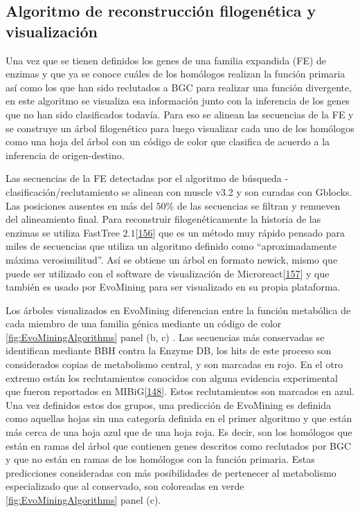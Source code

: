\documentclass[12pt,twoside]{reedthesis}
\begin{document}
  \subsection{Algoritmo de reconstrucción filogenética y
  visualización}\label{algoritmo-de-reconstruccion-filogenetica-y-visualizacion-1}
  
  Una vez que se tienen definidos los genes de una familia expandida (FE)
  de enzimas y que ya se conoce cuáles de los homólogos realizan la
  función primaria así como los que han sido reclutados a BGC para
  realizar una función divergente, en este algoritmo se visualiza esa
  información junto con la inferencia de los genes que no han sido
  clasificados todavía. Para eso se alinean las secuencias de la FE y se
  construye un árbol filogenético para luego visualizar cada uno de los
  homólogos como una hoja del árbol con un código de color que clasifica
  de acuerdo a la inferencia de origen-destino.
  
  Las secuencias de la FE detectadas por el algoritmo de búsqueda -
  clasificación/reclutamiento se alinean con muscle v3.2 y son curadas con
  Gblocks. Las posiciones ausentes en más del \(50\%\) de las secuencias
  se filtran y remueven del alineamiento final. Para reconstruir
  filogenéticamente la historia de las enzimas se utiliza FastTree
  \(2.1\){[}\protect\hyperlink{ref-price_fasttree_2010}{156}{]} que es un
  método muy rápido pensado para miles de secuencias que utiliza un
  algoritmo definido como ``aproximadamente máxima verosimilitud''. Así se
  obtiene un árbol en formato newick, mismo que puede ser utilizado con el
  software de visualización de
  Microreact{[}\protect\hyperlink{ref-argimon_microreact_2016}{157}{]} y
  que también es usado por EvoMining para ser visualizado en su propia
  plataforma.
  
  Los árboles visualizados en EvoMining diferencian entre la función
  metabólica de cada miembro de una familia génica mediante un código de
  color \autoref{fig:EvoMiningAlgorithms} panel (b, c) . Las secuencias
  más conservadas se identifican mediante BBH contra la Enzyme DB, los
  hits de este proceso son considerados copias de metabolismo central, y
  son marcadas en rojo. En el otro extremo están los reclutamientos
  conocidos con alguna evidencia experimental que fueron reportados en
  MIBiG{[}\protect\hyperlink{ref-medema_minimum_2015}{148}{]}. Estos
  reclutamientos son marcados en azul. Una vez definidos estos dos grupos,
  una predicción de EvoMining es definida como aquellas hojas sin una
  categoría definida en el primer algoritmo y que están más cerca de una
  hoja azul que de una hoja roja. Es decir, son los homólogos que están en
  ramas del árbol que contienen genes descritos como reclutados por BGC y
  que no están en ramas de los homólogos con la función primaria. Estas
  predicciones consideradas con más posibilidades de pertenecer al
  metabolismo especializado que al conservado, son coloreadas en verde
  \autoref{fig:EvoMiningAlgorithms} panel (c).
  
\end{document}
